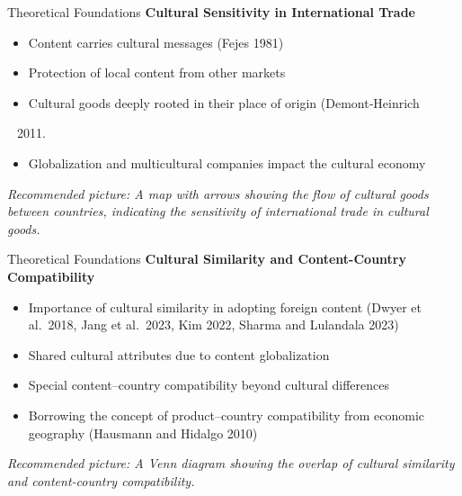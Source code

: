 \documentclass[
  ignorenonframetext,
]{beamer}
\providecommand{\tightlist}{%
  \setlength{\itemsep}{0pt}\setlength{\parskip}{0pt}}\usepackage{longtable,booktabs,array}
\begin{document}
\begin{frame}{Theoretical Foundations}
\protect\hypertarget{theoretical-foundations-1}{}
\textbf{Cultural Sensitivity in International Trade}

\begin{itemize}
\item
  Content carries cultural messages (Fejes 1981)
\item
  Protection of local content from other markets
\item
  Cultural goods deeply rooted in their place of origin (Demont‐Heinrich

  \begin{enumerate}
  [1)]
  \setcounter{enumi}{2010}
  \tightlist
  \item
  \end{enumerate}
\item
  Globalization and multicultural companies impact the cultural economy
\end{itemize}

\emph{Recommended picture: A map with arrows showing the flow of
cultural goods between countries, indicating the sensitivity of
international trade in cultural goods.}
\end{frame}

\begin{frame}{Theoretical Foundations}
\protect\hypertarget{theoretical-foundations-2}{}
\textbf{Cultural Similarity and Content-Country Compatibility}

\begin{itemize}
\item
  Importance of cultural similarity in adopting foreign content (Dwyer
  et al.~2018, Jang et al.~2023, Kim 2022, Sharma and Lulandala 2023)
\item
  Shared cultural attributes due to content globalization
\item
  Special content--country compatibility beyond cultural differences
\item
  Borrowing the concept of product--country compatibility from economic
  geography (Hausmann and Hidalgo 2010)
\end{itemize}

\emph{Recommended picture: A Venn diagram showing the overlap of
cultural similarity and content-country compatibility.}
\end{frame}
\end{document}

